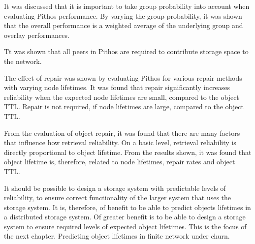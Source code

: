 It was discussed that it is important to take group probability into account when evaluating Pithos performance. By varying the group probability, it was shown that the overall performance is a weighted average of the underlying group and overlay performances.

Tt was shown that all peers in Pithos are required to contribute storage space to the network.

The effect of repair was shown by evaluating Pithos for various repair methods with varying node lifetimes. It was found that repair significantly increases reliability when the expected node lifetimes are small, compared to the object TTL. Repair is not required, if node lifetimes are large, compared to the object TTL.

From the evaluation of object repair, it was found that there are many factors that influence how retrieval reliability. On a basic level, retrieval reliability is directly proportional to object lifetime. From the results shown, it was found that object lifetime is, therefore, related to node lifetimes, repair rates and object TTL.

It should be possible to design a storage system with predictable levels of reliability, to ensure correct functionality of the larger system that uses the storage system. It is, therefore, of benefit to be able to predict objects lifetimes in a distributed storage system. Of greater benefit is to be able to design a storage system to ensure required levels of expected object lifetimes. This is the focus of the next chapter. Predicting object lifetimes in finite network under churn.
